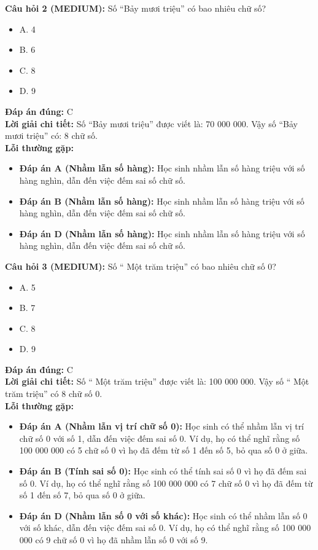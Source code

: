 \documentclass{article}
\begin{document}
\begin{minipage}{\textwidth}
\noindent\textbf{Câu hỏi 2 (MEDIUM):} Số “Bảy mươi triệu” có bao nhiêu chữ số? 
\begin{itemize}[label={}]
    \item A. 4
    \item B. 6
    \item C. 8
    \item D. 9
\end{itemize}
\textbf{Đáp án đúng:} C \\
\textbf{Lời giải chi tiết:} Số “Bảy mươi triệu” được viết là: 70 000 000. Vậy số “Bảy mươi triệu” có: 8 chữ số. \\
\textbf{Lỗi thường gặp:}
\begin{itemize}
  \item \textbf{Đáp án A (Nhầm lẫn số hàng):} Học sinh nhầm lẫn số hàng triệu với số hàng nghìn, dẫn đến việc đếm sai số chữ số.
  \item \textbf{Đáp án B (Nhầm lẫn số hàng):} Học sinh nhầm lẫn số hàng triệu với số hàng nghìn, dẫn đến việc đếm sai số chữ số.
  \item \textbf{Đáp án D (Nhầm lẫn số hàng):} Học sinh nhầm lẫn số hàng triệu với số hàng nghìn, dẫn đến việc đếm sai số chữ số.
\end{itemize}
\end{minipage}
\vspace{1em}

\begin{minipage}{\textwidth}
\noindent\textbf{Câu hỏi 3 (MEDIUM):} Số “ Một trăm triệu” có bao nhiêu chữ số 0? 
\begin{itemize}[label={}]
    \item A. 5
    \item B. 7
    \item C. 8
    \item D. 9
\end{itemize}
\textbf{Đáp án đúng:} C \\
\textbf{Lời giải chi tiết:} Số “ Một trăm triệu” được viết là: 100 000 000. Vậy số “ Một trăm triệu” có 8 chữ số 0. \\
\textbf{Lỗi thường gặp:}
\begin{itemize}
  \item \textbf{Đáp án A (Nhầm lẫn vị trí chữ số 0):} Học sinh có thể nhầm lẫn vị trí chữ số 0 với số 1, dẫn đến việc đếm sai số 0. Ví dụ, họ có thể nghĩ rằng số 100 000 000 có 5 chữ số 0 vì họ đã đếm từ số 1 đến số 5, bỏ qua số 0 ở giữa.
  \item \textbf{Đáp án B (Tính sai số 0):} Học sinh có thể tính sai số 0 vì họ đã đếm sai số 0. Ví dụ, họ có thể nghĩ rằng số 100 000 000 có 7 chữ số 0 vì họ đã đếm từ số 1 đến số 7, bỏ qua số 0 ở giữa.
  \item \textbf{Đáp án D (Nhầm lẫn số 0 với số khác):} Học sinh có thể nhầm lẫn số 0 với số khác, dẫn đến việc đếm sai số 0. Ví dụ, họ có thể nghĩ rằng số 100 000 000 có 9 chữ số 0 vì họ đã nhầm lẫn số 0 với số 9.
\end{itemize}
\end{minipage}
\vspace{1em}
\end{document}
